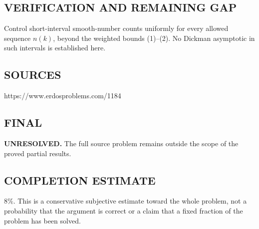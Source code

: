 \subsection*{VERIFICATION AND REMAINING GAP}
Control short-interval smooth-number counts uniformly for every allowed
sequence $n(k)$, beyond the weighted bounds (1)--(2). No Dickman asymptotic
in such intervals is established here.

\subsection*{SOURCES}
https://www.erdosproblems.com/1184

\subsection*{FINAL}
\textbf{UNRESOLVED.} The full source problem remains outside the scope of the proved partial results.

\subsection*{COMPLETION ESTIMATE}
$8\%$. This is a conservative subjective estimate toward the whole problem, not a probability that the argument is correct or a claim that a fixed fraction of the problem has been solved.
